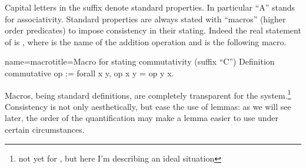 






Capital letters in the suffix denote standard properties.
In particular ``A'' stands for associativity.  Standard properties are
always stated with ``macros'' (higher order predicates) to impose
consistency in their stating.  Indeed the real statement of
 is , where  is the
name of the addition operation and  is the
following macro.

\begin{coq}{name=macro}{title=Macro for stating commutativity (suffix ``C'')}
Definition commutative op := forall x y, op x y = op y x.
\end{coq}

Macros, being standard definitions, are completely transparent for the
system.\footnote{not yet for , but here I'm describing an ideal
situation}  Consistency is not only aesthetically, but ease the use of
lemmas: as we will see later, the order of the quantification may make
a lemma easier to use under certain circumstances.

